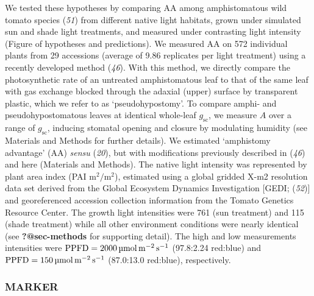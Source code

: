 \documentclass[
  letterpaper,
  DIV=11,
  numbers=noendperiod]{scrartcl}
\newcommand{\aax}{$\mathrm{AA}$}
\newcommand{\ppfdequals}[1]{$\mathrm{PPFD} = \qty{#1}{\micro\mol\raiseto{-2}\meter\raiseto{-1}\second}$}
\begin{document}
We tested these hypotheses by comparing AA among amphistomatous wild
tomato species (\emph{51}) from different native light habitats, grown
under simulated sun and shade light treatments, and measured under
contrasting light intensity (Figure of hypotheses and predictions). We
measured AA on 572 individual plants from 29 accessions (average of 9.86
replicates per light treatment) using a recently developed method
(\emph{46}). With this method, we directly compare the photosynthetic
rate of an untreated amphistomatous leaf to that of the same leaf with
gas exchange blocked through the adaxial (upper) surface by transparent
plastic, which we refer to as `pseudohypostomy'. To compare amphi- and
pseudohypostomatous leaves at identical whole-leaf \(g_\text{sc}\), we
measure \(A\) over a range of \(g_\text{sc}\), inducing stomatal opening
and closure by modulating humidity (see Materials and Methods for
further details). We estimated `amphistomy advantage' (\aax)
\emph{sensu} (\emph{20}), but with modifications previously described in
(\emph{46}) and here (Materials and Methods). The native light intensity
was represented by plant area index (PAI
\(\unit{\meter\squared\per\meter\squared}\)), estimated using a global
gridded X-m2 resolution data set derived from the Global Ecosystem
Dynamics Investigation {[}GEDI; (\emph{52}){]} and georeferenced
accession collection information from the Tomato Genetics Resource
Center. The growth light intensities were 761 (sun treatment) and 115
(shade treatment) while all other environment conditions were nearly
identical (see \textbf{?@sec-methods} for supporting detail). The high
and low measurements intensities were \ppfdequals{2000} (97.8:2.24
red:blue) and \ppfdequals{150} (87.0:13.0 red:blue), respectively.

\subsubsection{MARKER}\label{marker}
\end{document}
